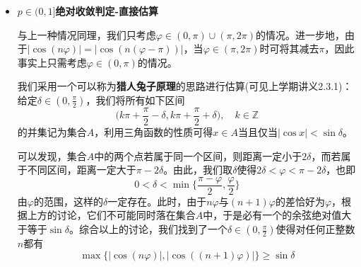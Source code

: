 \documentclass[a4paper,UTF8,fontset=windows,AutoFakeBold]{ctexart}
\newcommand*{\suminf}[1][n=1]{\sum_{#1}^\infty}
\newcommand*{\note}{\noindent *}
\theoremstyle{ex}
\begin{document}
\begin{enumerate}
{\begin{itemize}
            我们进行如下的放缩：
            $$\frac{|\cos(n\varphi)|}{n^p}\ge\frac{\cos^2(n\varphi)}{n^p}=\frac{1}{2n^p}+\frac{\cos(2n\varphi)}{2n^p}$$
            在$p\in(0,1]$时利用\textbf{$p$级数}敛散性结论可知$\suminf\frac{1}{n^p}$发散，从而$\suminf\frac{1}{2n^p}$发散。另一方面，由$\varphi\in(0,\pi)\cup(\pi,2\pi)$可知$\sin\varphi\ne0$，从而利用\textbf{等差数列的正弦求和公式}(可见上学期讲义7.2.1)得
            $$\sum_{n=1}^m\cos(2n\varphi)=\sum_{n=1}^m\sin\bigg(2n\varphi+\frac{\pi}{2}\bigg)=\frac{\sin((n+1)\varphi)\cos(n\varphi)}{\sin\varphi}$$
            由此可进一步得到
            $$\bigg|\sum_{n=1}^m\cos(2n\varphi)\bigg|\le\frac{1}{|\sin\varphi|}$$
            将级数$\suminf\frac{\cos(2n\varphi)}{2n^p}$写为
            $$\suminf\frac{1}{2n^p}\cdot\cos(2n\varphi)$$
            之前的推导已证明$\cos(2n\varphi)$的部分和有界，而$\frac{1}{2n^p}$随$n$增加单调递减趋于0，利用\textbf{迪利克雷判别法}得其收敛。

            综合以上，利用\textbf{级数的性质}可知发散级数与收敛级数之和发散，因此$\suminf\big(\frac{1}{2n^p}+\frac{\cos(2n\varphi)}{2n^p}\big)$发散，再由正项级数的\textbf{比较判别法}最终得到$\suminf\frac{|\cos(n\varphi)|}{n^p}$发散，原级数不绝对收敛。

            \note 建议记忆三角函数等差数列的正弦求和公式，它常用于一些三角函数相关的级数估算。

            \note 此方法相对简洁，但\textbf{难以适用一般情况}，如将分子的$\cos(n\varphi)$改为$\cos^9(n\varphi)$后即难以处理。下一种方法虽然书写相对复杂，但应用范围实际上更广。
            
            \item \textbf{$p\in(0,1]$绝对收敛判定-直接估算}
                
            与上一种情况同理，我们只考虑$\varphi\in(0,\pi)\cup(\pi,2\pi)$的情况。进一步地，由于$|\cos(n\varphi)|=|\cos(n(\varphi-\pi))|$，当$\varphi\in(\pi,2\pi)$时可将其减去$\pi$，因此事实上只需考虑$\varphi\in(0,\pi)$的情况。

            我们采用一个可以称为\textbf{猎人兔子原理}的思路进行估算(可见上学期讲义2.3.1)：给定$\delta\in(0,\frac{\pi}{2})$，我们将所有如下区间
            $$\bigg(k\pi+\frac{\pi}{2}-\delta,k\pi+\frac{\pi}{2}+\delta\bigg),\quad k\in\mathbb{Z}$$
            的并集记为集合$A$，利用三角函数的性质可得$x\in A$当且仅当$|\cos x|<\sin\delta$。

            可以发现，集合$A$中的两个点若属于同一个区间，则距离一定小于$2\delta$，而若属于不同区间，距离一定大于$\pi-2\delta$。由此，我们取$\delta$使得$2\delta<\varphi<\pi-2\delta$，也即
            $$0<\delta<\min\bigg\{\frac{\pi-\varphi}{2},\frac{\varphi}{2}\bigg\}$$
            由$\varphi$的范围，这样的$\delta$一定存在。此时，由于$n\varphi$与$(n+1)\varphi$的差恰好为$\varphi$，根据上方的讨论，它们不可能同时落在集合$A$中，于是必有一个的余弦绝对值大于等于$\sin\delta$。综合以上的讨论，我们找到了一个$\delta\in(0,\frac{\pi}{2})$使得对任何正整数$n$都有
            $$\max\{|\cos(n\varphi)|,|\cos((n+1)\varphi)|\}\ge\sin\delta$$


\end{itemize}}
\end{enumerate}
\end{document}

